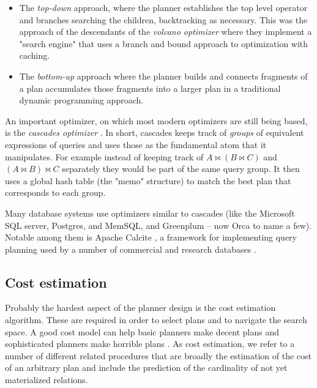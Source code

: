 \begin{itemize}
\item The \emph{top-down} approach, where the planner establishes the
  top level operator and branches searching the children, backtracking
  as necessary. This was the approach of the descendants of the
  \emph{volcano optimizer} \cite{graefeVolcanoOptimizerGenerator1993a}
  where they implement a "search engine" that uses a branch and bound
  approach to optimization with caching.
\item The \emph{bottom-up} approach where the planner builds and connects
  fragments of a plan accumulates those fragments into a larger plan in a
  traditional dynamic programming approach.
  \cite{raasveldtDuckdbEmbeddableAnalytical2019,kemperHyPerHybridOLTP2011}
\end{itemize}

An important optimizer, on which most modern optimizers are still
being based, is the \emph{cascades optimizer}
\cite{graefeCascadesFrameworkQuery1995}. In short, cascades keeps
track of \emph{groups} of equivalent expressions of queries and uses
those as the fundamental atom that it manipulates. For example instead
of keeping track of \(A \Join (B \Join C)\) and
\((A \Join B) \Join C\) separately they would be part of the same
query group. It then uses a global hash table (the "memo" structure)
to match the best plan that corresponds to each group.

Many database systems use optimizers similar to cascades (like the
Microsoft SQL server, Postgres, and
MemSQL\cite{chenMemSQLQueryOptimizer2016}, and Greenplum -- now Orca
\cite{solimanOrcaModularQuery2014a} to name a few). Notable among them
is Apache Calcite \cite{begoliApacheCalciteFoundational2018}, a
framework for implementing query planning used by a number of
commercial and research databases
\cite{nunesalonsoBuildingPolyglotData2020}.

\subsection{Cost estimation}

Probably the hardest aspect of the planner design is the cost
estimation algorithm. These are required in order to select plans and
to navigate the search space. A good cost model can help basic
planners make decent plans and sophisticated planners make horrible
plans \cite{leisHowGoodAre2015}. As cost estimation, we refer to a
number of different related procedures that are broadly the estimation
of the cost of an arbitrary plan and include the prediction of the
cardinality of not yet materialized relations.

